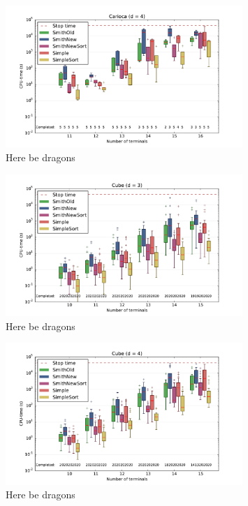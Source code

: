 \begin{figure}[htbp]
  \centering
  \includegraphics[width=0.8\textwidth]{gfx/boxplots/plot_nvst_boxplot_d4_Carioca_1}
  \caption[Here be dragons]{Here be dragons}
\end{figure}

\begin{figure}[htbp]
  \centering
  \includegraphics[width=0.8\textwidth]{gfx/boxplots/plot_nvst_boxplot_d3_Cube_1}
  \caption[Here be dragons]{Here be dragons}
\end{figure}

\begin{figure}[htbp]
  \centering
  \includegraphics[width=0.8\textwidth]{gfx/boxplots/plot_nvst_boxplot_d4_Cube_1}
  \caption[Here be dragons]{Here be dragons}
\end{figure}

